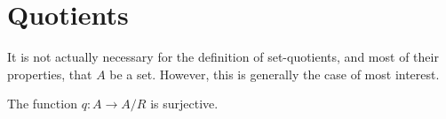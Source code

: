 \documentclass[hott-all.tex]{subfiles}
\begin{document}
\section{Quotients}
% 
% 
\begin{rmk}
  It is not actually necessary for the definition of set-quotients, and most of their properties, that $A$ be a set.
  However, this is generally the case of most interest.
\end{rmk}
% 
\begin{lem}
  The function $q:A\to A/R$ is surjective.
\end{lem}
% 
\end{document}
